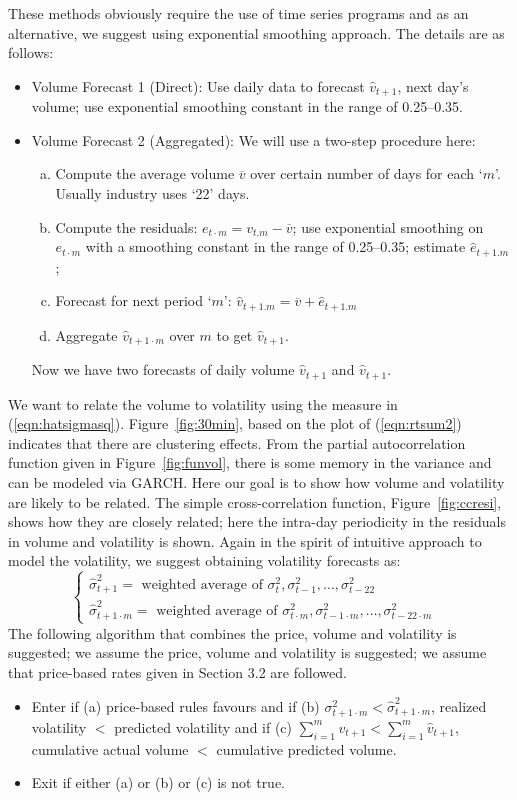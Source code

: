 	
These methods obviously require the use of time series programs and as an alternative, we suggest using exponential smoothing approach. The details are as follows:
	\begin{itemize}
	\item Volume Forecast 1 (Direct): Use daily data to forecast $\hat{v}_{t+1}$, next day's volume; use exponential smoothing constant in the range of 0.25--0.35.
	\item Volume Forecast 2 (Aggregated): We will use a two-step procedure here:
		\begin{enumerate}[(a)]
		\item Compute the average volume $\overline{v}$ over certain number of days for each `$m$'. Usually industry uses `22' days.
		\item Compute the residuals: $e_{t\cdot m} = v_{t . m} - \overline{v}$; use exponential smoothing on $e_{t\cdot m}$ with a smoothing constant in the range of 0.25--0.35; estimate $\hat{e}_{t+1 . m}$;
		\item Forecast for next period `$m$': $\hat{v}_{t+1. m}=\overline{v}+\hat{e}_{t+1 . m}$
		\item Aggregate $\hat{v}_{t+1\cdot m}$ over $m$ to get $\hat{v}_{t+1}$. 
		\end{enumerate}
	Now we have two forecasts of daily volume $\hat{v}_{t+1}$ and $\hat{v}_{t+1}$.
	\end{itemize}
We want to relate the volume to volatility using the measure in (\ref{eqn:hatsigmasq}). Figure~\ref{fig:30min}, based on the plot of (\ref{eqn:rtsum2}) indicates that there are clustering effects. From the partial autocorrelation function given in Figure~\ref{fig:funvol}, there is some memory in the variance and can be modeled via GARCH. Here our goal is to show how volume and volatility are likely to be related. The simple cross-correlation function, Figure~\ref{fig:ccresi}, shows how they are closely related; here the intra-day periodicity in the residuals in volume and volatility is shown. Again in the spirit of intuitive approach to model the volatility, we suggest obtaining volatility forecasts as:
	\[
	\begin{cases}
	\hat{\sigma}_{t+1}^2 = \text{ weighted average of } \sigma_t^2, \sigma_{t-1}^2, \ldots, \sigma_{t-22}^2 & \\
	\hat{\sigma}^2_{t+1 \cdot m}= \text{ weighted average of } \sigma_{t\cdot m}^2, \sigma_{t-1 \cdot m}^2, \ldots, \sigma_{t-22\cdot m}^2 & 
	\end{cases}
	\]
The following algorithm that combines the price, volume and volatility is suggested; we assume the price, volume and volatility is suggested; we assume that price-based rates given in Section 3.2  are followed.
	\begin{itemize}
	\item Enter if (a) price-based rules favours and if (b) $\sigma_{t+1\cdot m}^2< \hat{\sigma}_{t+1\cdot m}^2$, realized volatility $<$ predicted volatility and if (c) $\sum_{i=1}^m v_{t+1} < \sum_{i=1}^m \hat{v}_{t+1}$, cumulative actual volume $<$ cumulative predicted volume. 
	\item Exit if either (a) or (b) or (c) is not true. 
	\end{itemize}
 
